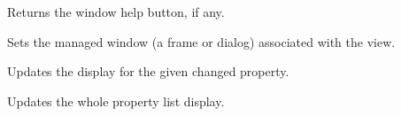 
Returns the window help button, if any.

\label{wxpropertylistviewsetmanagedwindow}


Sets the managed window (a frame or dialog) associated with the view.

\label{wxpropertylistviewupdatepropdisplay}


Updates the display for the given changed property.

\label{wxpropertylistviewupdateproplist}


Updates the whole property list display.

